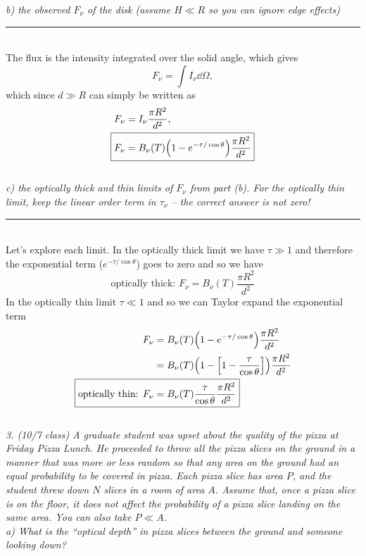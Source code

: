 \documentclass[12pt, letterpaper, twoside]{article}
\newcommand{\answer}[1]{
    \par\noindent\rule{\textwidth}{0.4pt}\\#1\\
}
\begin{document}
{\it b)  the observed $F_\nu$ of the disk  (assume $H\ll R$ so you can ignore edge effects)}

\answer{
    The flux is the intensity integrated over the solid angle, which gives
    \begin{equation}
        F_\nu = \int I_\nu \dd{\Omega},
    \end{equation}
    which since $d \gg R$ can simply be written as
    \begin{align}
        F_\nu &= I_\nu \frac{\pi R^2}{d^2},\\
        \Aboxed{ F_\nu &= B_\nu(T) \qty(1 - e^{-\tau / \cos \theta}) \frac{\pi R^2}{d^2} }
    \end{align}
}

{\it c)  the optically thick and thin limits of $F_\nu$ from part (b).  {\it For the optically thin limit, keep the linear order term in $\tau_\nu$ -- the correct answer is not zero!}}

\answer{
    Let's explore each limit. In the optically thick limit we have $\tau \gg 1$ and therefore the exponential term ($e^{-\tau / \cos \theta}$) goes to zero and so we have
    \begin{equation}
        \boxed{ \text{optically thick: } F_\nu = B_\nu(T) \frac{\pi R^2}{d^2} }
    \end{equation}
    In the optically thin limit $\tau \ll 1$ and so we can Taylor expand the exponential term
    \begin{align}
        F_\nu &= B_\nu(T) \qty(1 - e^{-\tau / \cos \theta}) \frac{\pi R^2}{d^2} \\
        &= B_\nu(T) \qty(1 - \qty[1 - \frac{\tau}{\cos \theta}]) \frac{\pi R^2}{d^2} \\
        \Aboxed{ \text{optically thin: } F_\nu &= B_\nu(T) \frac{\tau}{\cos \theta} \frac{\pi R^2}{d^2} }
    \end{align}
}

{\it 3. {\it   (10/7 class)} A graduate student was upset about the quality of the pizza at Friday Pizza Lunch.  He proceeded to throw all the pizza slices on the ground in a manner that was more or less random so that any area on the ground had an equal probability to be covered in pizza.  Each pizza slice has area $P$, and the student threw down $N$ slices in a room of area $A$.  Assume that, once a pizza slice is on the floor, it does not affect the probability of a pizza slice landing on the same area.  You can also take $P \ll A$.  \\
a) What is the ``optical depth'' in pizza slices between the ground and someone looking down?}
\end{document}

